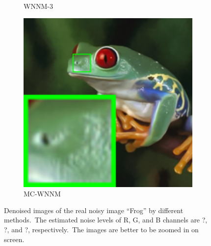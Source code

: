 \begin{figure}
\begin{subfigure}[t]{0.19\textwidth}
		\caption{WNNM-3}
    \end{subfigure}
    \hfill
    \begin{subfigure}[t]{0.19\textwidth}
        \centering
        \includegraphics[width=1\textwidth]{images/mcwnnm/nc/resize_br_CWNNM_ADMM_NL_frog.png}
		\caption{MC-WNNM}
    \end{subfigure}
    \caption{Denoised images of the real noisy image ``Frog'' \cite{ncwebsite} by different methods.\ The estimated noise levels of R, G, and B channels are ?, ?, and ?, respectively.\ The images are better to be zoomed in on screen.}
    \label{fig4-10}
\end{figure}


